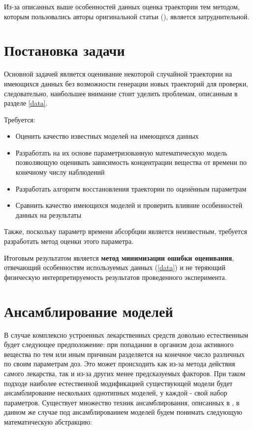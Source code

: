 \documentclass[oneside,senior,etd]{BYUPhys}
\begin{document}
Из-за описанных выше особенностей данных оценка траектории тем методом, которым пользовались авторы оригинальной статьи (\cite{pbftpk}), является затруднительной.

\newpage

\section{Постановка задачи}

Основной задачей является оценивание некоторой случайной траектории на имеющихся данных без возможности генерации новых траекторий для проверки, следовательно, наибольшее внимание стоит уделить проблемам, описанным в разделе \ref{data}.

Требуется:
\begin{itemize}
	\item Оценить качество известных моделей на имеющихся данных
	\item Разработать на их основе параметризованную математическую модель позволяющую оценивать зависимость концентрации вещества от времени по конечному числу наблюдений
	\item Разработать алгоритм восстановления траектории по оценённым параметрам
	\item Сравнить качество имеющихся моделей и проверить влияние особенностей данных на результаты
\end{itemize}

Также, поскольку параметр времени абсорбции является неизвестным, требуется разработать метод оценки этого параметра.

Итоговым результатом является \textbf{метод минимизации ошибки оценивания}, отвечающий особенностям используемых данных (\ref{data}) и не теряющий физическую интерпретируемость результатов проведенного эксперимента.

\section{Ансамблирование моделей}

В случае комплексно устроенных лекарственных средств довольно естественным будет следующее предположение: при попадании в организм доза активного вещества по тем или иным причинам разделяется на конечное число различных по своим параметрам доз. Это может происходить как из-за метода действия самого лекарства, так и из-за других менее предсказуемых факторов. При таком подходе наиболее естественной модификацией существующей модели будет ансамблирование нескольких однотипных моделей, у каждой - свой набор параметров. Существует множество техник ансамблирования, описанных в \cite{Wang2021, Neal1996, Breiman1996, Friedman2001}, в данном же случае под ансамблированием моделей будем понимать следующую математическую абстракцию:
\end{document}
